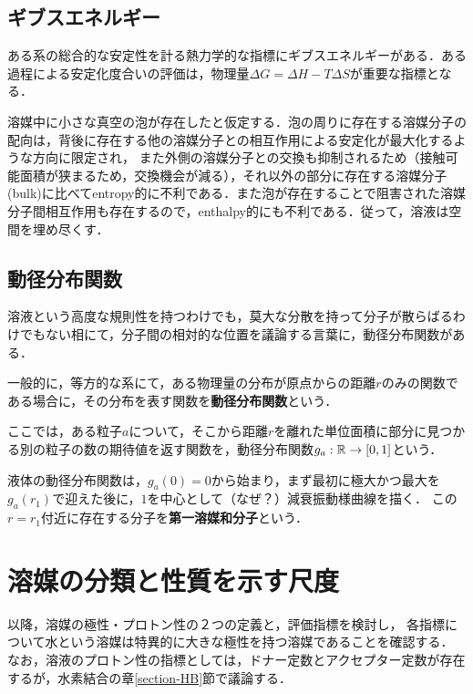 \documentclass[uplatex, dvipdfmx]{jsreport}
\begin{document}
\subsection{ギブスエネルギー}
\begin{definition}
    ある系の総合的な安定性を計る熱力学的な指標にギブスエネルギーがある．ある過程による安定化度合いの評価は，物理量$\Delta G=\Delta H-T\Delta S$が重要な指標となる．
\end{definition}
\begin{example}[溶媒における溶媒分子の配置]
    溶媒中に小さな真空の泡が存在したと仮定する．泡の周りに存在する溶媒分子の配向は，背後に存在する他の溶媒分子との相互作用による安定化が最大化するような方向に限定され，
    また外側の溶媒分子との交換も抑制されるため（接触可能面積が狭まるため，交換機会が減る），それ以外の部分に存在する溶媒分子(bulk)に比べてentropy的に不利である．また泡が存在することで阻害された溶媒分子間相互作用も存在するので，enthalpy的にも不利である．従って，溶液は空間を埋め尽くす．
\end{example}

\subsection{動径分布関数}
溶液という高度な規則性を持つわけでも，莫大な分散を持って分子が散らばるわけでもない相にて，分子間の相対的な位置を議論する言葉に，動径分布関数がある．
\begin{definition}
    一般的に，等方的な系にて，ある物理量の分布が原点からの距離$r$のみの関数である場合に，その分布を表す関数を\textbf{動径分布関数}という．

    ここでは，ある粒子$a$について，そこから距離$r$を離れた単位面積に部分に見つかる別の粒子の数の期待値を返す関数を，動径分布関数$g_a:\mathbb{R}\to[0,1]$という．
\end{definition}
\begin{fact}
    液体の動径分布関数は，$g_a(0)=0$から始まり，まず最初に極大かつ最大を$g_a(r_1)$で迎えた後に，$1$を中心として（なぜ？）減衰振動様曲線を描く．
    この$r=r_1$付近に存在する分子を\textbf{第一溶媒和分子}という．
\end{fact}

\section{溶媒の分類と性質を示す尺度}
以降，溶媒の極性・プロトン性の２つの定義と，評価指標を検討し，
各指標について水という溶媒は特異的に大きな極性を持つ溶媒であることを確認する．
なお，溶液のプロトン性の指標としては，ドナー定数とアクセプター定数が存在するが，水素結合の章\ref{section-HB}節で議論する．
\end{document}
